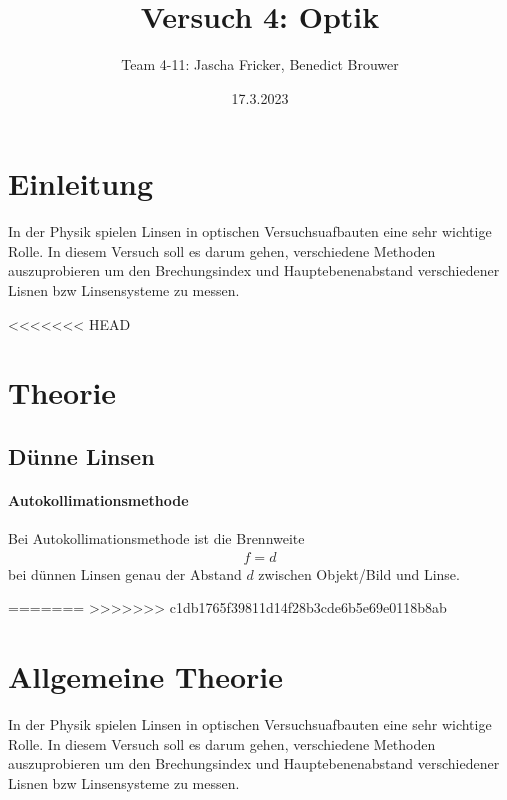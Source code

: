 \documentclass[11pt, a4paper]{article}
\title{Versuch 4: Optik}
\author{Team 4-11: Jascha Fricker, Benedict Brouwer}
\date{17.3.2023}
\begin{document}
    \def\Dimline[#1][#2][#3]{
        \begin{scope}[>=latex] %
            \draw let \p1=#1, \p2=#2, \n0={veclen(\x2-\x1,\y2-\y1)} in [|<->|,
            decoration={markings, %
                    mark=at position 0.5 with {\node[#3] at (0,0) {\DimScale{\n0}};},
            },
            postaction=decorate] #1 -- #2 ;
        \end{scope}
    }

    \def\DimScale#1{\pgfmathparse{round(#1/28.4*10.0)/10.0}\pgfmathresult cm}

    \maketitle

    \tableofcontents

    \newpage

    \section{Einleitung}
    In der Physik spielen Linsen in optischen Versuchsuafbauten eine sehr wichtige Rolle. In diesem Versuch soll es darum gehen, verschiedene 
    Methoden auszuprobieren um den Brechungsindex und Hauptebenenabstand verschiedener Lisnen bzw Linsensysteme zu messen.

<<<<<<< HEAD

    \section{Theorie}

    \subsection{Dünne Linsen}
    \paragraph{Autokollimationsmethode}
    Bei Autokollimationsmethode ist die Brennweite
    \begin{align}
        f = d \label{eq:auto}
    \end{align}
    bei dünnen Linsen genau der Abstand $d$ zwischen Objekt/Bild und Linse.

=======
>>>>>>> c1db1765f39811d14f28b3cde6b5e69e0118b8ab
    \section{Allgemeine Theorie}
    \FloatBarrier
    In der Physik spielen Linsen in optischen Versuchsuafbauten eine sehr wichtige Rolle. In diesem Versuch soll es darum gehen, verschiedene 
    Methoden auszuprobieren um den Brechungsindex und Hauptebenenabstand verschiedener Lisnen bzw Linsensysteme zu messen.
\end{document}

